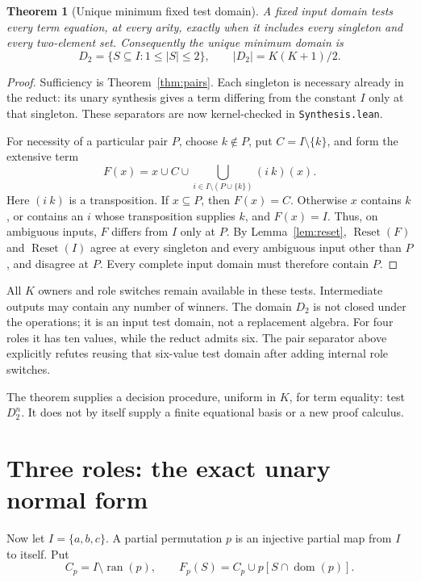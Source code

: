 \documentclass[11pt]{article}
\newtheorem{theorem}{Theorem}[section]
\begin{document}
\begin{theorem}[Unique minimum fixed test domain]\label{thm:optimal}
A fixed input domain tests every term equation, at every arity, exactly
when it includes every singleton and every two-element set. Consequently
the unique minimum domain is
\[
 D_2=\{S\subseteq I:1\leq|S|\leq2\},\qquad |D_2|=K(K+1)/2.
\]
\end{theorem}
\begin{proof}
Sufficiency is Theorem~\ref{thm:pairs}. Each singleton is necessary
already in the reduct: its unary synthesis gives a term differing from
the constant $I$ only at that singleton. These separators are now
kernel-checked in \texttt{Synthesis.lean}.

For necessity of a particular pair $P$, choose $k\notin P$, put
$C=I\setminus\{k\}$, and form the extensive term
\[
 F(x)=x\cup C\cup\bigcup_{i\in I\setminus(P\cup\{k\})}(i\ k)(x).
\]
Here $(i\ k)$ is a transposition. If $x\subseteq P$, then $F(x)=C$.
Otherwise $x$ contains $k$, or contains an $i$ whose transposition
supplies $k$, and $F(x)=I$. Thus, on ambiguous inputs, $F$ differs from
$I$ only at $P$. By Lemma~\ref{lem:reset},
$\operatorname{Reset}(F)$ and $\operatorname{Reset}(I)$ agree at every
singleton and every ambiguous input other than $P$, and disagree at
$P$. Every complete input domain must therefore contain $P$.
\end{proof}

All $K$ owners and role switches remain available in these tests.
Intermediate outputs may contain any number of winners. The domain
$D_2$ is not closed under the operations; it is an input test domain,
not a replacement algebra. For four roles it has ten values, while the
reduct admits six. The pair separator above explicitly refutes reusing
that six-value test domain after adding internal role switches.

The theorem supplies a decision procedure, uniform in $K$, for term
equality: test $D_2^n$. It does not by itself supply a finite equational
basis or a new proof calculus.

\section{Three roles: the exact unary normal form}

Now let $I=\{a,b,c\}$. A partial permutation $p$ is an injective partial
map from $I$ to itself. Put
\[
 C_p=I\setminus\operatorname{ran}(p),\qquad
 F_p(S)=C_p\cup p[S\cap\operatorname{dom}(p)].
\]
\end{document}
